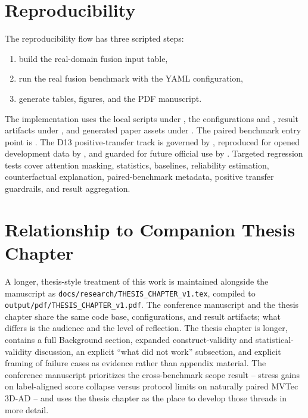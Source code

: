 \documentclass[10pt,conference]{IEEEtran}
\begin{document}
\section{Reproducibility}
The reproducibility flow has three scripted steps:
\begin{enumerate}
  \item build the real-domain fusion input table,
  \item run the real fusion benchmark with the YAML configuration,
  \item generate tables, figures, and the PDF manuscript.
\end{enumerate}
The implementation uses the local scripts under , the
configurations  and
, result artifacts under
, and generated paper assets under
. The paired benchmark entry point is
. The D13 positive-transfer
track is governed by
, reproduced for opened
development data by
, and guarded
for future official use by
. Targeted
regression tests cover attention masking, statistics, baselines, reliability
estimation, counterfactual explanation, paired-benchmark metadata, positive
transfer guardrails, and result aggregation.

\section{Relationship to Companion Thesis Chapter}
\label{sec:thesis-link}
A longer, thesis-style treatment of this work is maintained alongside the
manuscript as \texttt{docs/research/THESIS\_CHAPTER\_v1.tex}, compiled to
\texttt{output/pdf/THESIS\_CHAPTER\_v1.pdf}. The conference manuscript and the
thesis chapter share the same code base, configurations, and result
artifacts; what differs is the audience and the level of reflection. The
thesis chapter is longer, contains a full Background section, expanded
construct-validity and statistical-validity discussion, an explicit
``what did not work'' subsection, and explicit framing of failure cases as
evidence rather than appendix material. The conference manuscript prioritizes
the cross-benchmark scope result -- stress gains on label-aligned score
collapse versus protocol limits on naturally paired MVTec 3D-AD -- and uses the
thesis chapter as the place to develop those threads in more detail.
\end{document}
